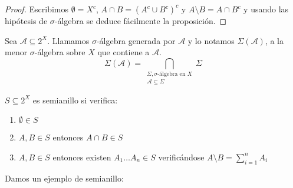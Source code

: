   \begin{proof}
   Escribimos $\emptyset = X^c$, $A\cap B = (A^c \cup B^c)^c$ y $A\setminus B = A\cap B^c$
   y usando las hipótesis de $\sigma$-álgebra se deduce fácilmente la proposición.
  \end{proof}

\begin{definition}
 Sea $\mathcal{A} \subseteq 2^X$. Llamamos $\sigma$-álgebra generada por $\mathcal{A}$ y lo notamos 
 $\Sigma(\mathcal{A})$, a la menor $\sigma$-álgebra sobre $X$ que contiene a $\mathcal{A}$.
 \[
   \Sigma(\mathcal{A}) = 
   \bigcap_{\begin{array}{c}\Sigma, \sigma\textrm{-álgebra en } X\\ \mathcal{A}\subseteq \Sigma \end{array}} \Sigma
 \]
\end{definition}

\begin{definition}[Semianillo en $X$]

 $S\subseteq 2^X$ es semianillo si verifica:
 
 \begin{enumerate}[i]
  \item $\emptyset \in S$
  \item $A,B \in S$ entonces $A\cap B \in S$
  \item $A,B \in S$ entonces existen $A_1 \ldots A_n \in S$ verificándose $A\setminus B = \sum_{i=1}^n A_i$
 \end{enumerate}
\end{definition}

Damos un ejemplo de semianillo:

